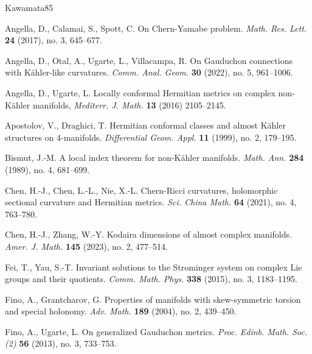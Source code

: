 \documentclass[12pt, reqno]{amsart}
\theoremstyle{plain}
\theoremstyle{definition}
\renewcommand{\>}{\rightarrow}
\renewcommand{\>}{\rightarrow}
\numberwithin{equation}{section} %
\begin{document}
\baselineskip






   \begin{thebibliography}{Kawamata85}


     Angella, D., Calamai, S., Spott, C. On Chern-Yamabe problem.
    \emph{Math. Res. Lett.} \textbf{24} (2017), no. 3, 645--677.




     Angella, D., Otal, A., Ugarte, L., Villacampa, R.
    On Gauduchon connections with K\"ahler-like curvatures. \emph{Comm. Anal. Geom.} \textbf{30} (2022), no. 5, 961--1006.

     Angella, D., Ugarte, L. Locally conformal Hermitian metrics on
    complex non-K\"ahler manifolds, \emph{Mediterr. J. Math.}
    \textbf{13} (2016) 2105--2145.

     Apostolov, V., Draghici, T. Hermitian conformal classes and
    almost K\"ahler structures on 4-manifolds. \emph{Differential Geom.
        Appl.} \textbf{11} (1999), no. 2, 179--195.

     Bismut, J.-M.  A local index theorem for non-K\"ahler manifolds.
    \emph{Math. Ann.} \textbf{284} (1989), no. 4, 681--699.




     Chen, H.-J., Chen, L.-L., Nie, X.-L.
    Chern-Ricci curvatures, holomorphic sectional curvature and
    Hermitian metrics. \emph{Sci. China Math.}  \textbf{64} (2021), no. 4, 763--780.





     Chen, H.-J., Zhang, W.-Y. Kodaira dimensions of almost complex manifolds. \emph{Amer. J. Math.} \textbf{145} (2023), no. 2, 477--514.

     Fei, T., Yau, S.-T. Invariant solutions to the Strominger system on complex Lie groups and their quotients.
    \emph{Comm. Math. Phys.} \textbf{338} (2015), no. 3, 1183--1195.

     Fino, A., Grantcharov, G.
    Properties of manifolds with skew-symmetric torsion and special
    holonomy. \emph{Adv. Math.} \textbf{189} (2004), no. 2, 439--450.

     Fino, A., Ugarte, L. On generalized Gauduchon metrics.
    \emph{Proc. Edinb. Math. Soc. (2)}  \textbf{56} (2013), no. 3,
    733--753.



\end{thebibliography}
\end{document}
